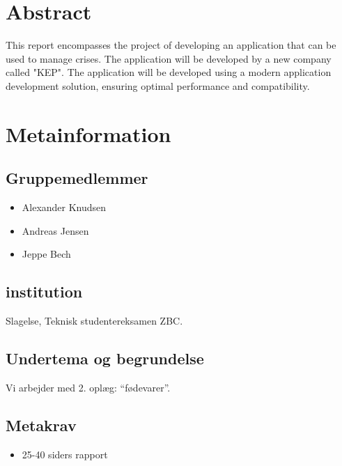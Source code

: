 \section{Abstract}
This report encompasses the project of developing an application that can be used to manage crises. The application will be developed by a new company called "KEP". The application will be developed using a modern application development solution, ensuring optimal performance and compatibility.

\newpage

\section{Metainformation}
\subsection{Gruppemedlemmer}
\begin{itemize}
  \item Alexander Knudsen
  \item Andreas Jensen
  \item Jeppe Bech
\end{itemize}
\subsection{institution}
Slagelse, Teknisk studentereksamen ZBC.
\subsection{Undertema og begrundelse}
Vi arbejder med 2. oplæg: ``fødevarer''.
\subsection{Metakrav}
\begin{itemize}
  \item 25-40 siders rapport
\end{itemize}
